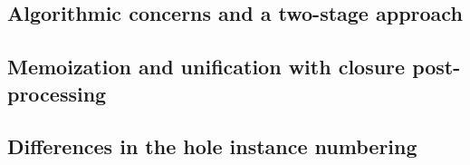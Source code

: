 \subsection{Algorithmic concerns and a two-stage approach}
\label{sec:two-stage-renumber}

\subsection{Memoization and unification with closure post-processing}
\label{sec:renumbering_memoization}

\subsection{Differences in the hole instance numbering}
\label{sec:differences_numbering}


